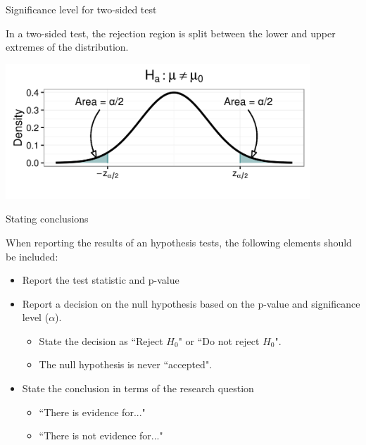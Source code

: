 \documentclass[xcolor=table, handout]{beamer}
\begin{document}
\begin{frame}{Significance level for two-sided test}
\begin{block}{}
\large
In a two-sided test, the rejection region is split between the lower and upper extremes of the distribution.
\end{block}
\bigskip
{\centering
\includegraphics[width=4.5in]{../images/ch08_sig_2}
\par}

\end{frame}


\begin{frame}{Stating conclusions}
\begin{block}{}
\large
When reporting the results of an hypothesis tests, the following elements should be included:
\begin{itemize}
\pause\item Report the test statistic and p-value
\pause\item Report a decision on the null hypothesis based on the p-value and significance level ($\alpha$). 
\begin{itemize}
\item State the decision as ``Reject $H_0$" or ``Do not reject $H_0$".
\item The null hypothesis is never ``accepted".
\end{itemize}
\pause\item State the conclusion in terms of the research question
\begin{itemize}
\item ``There is evidence for..."
\item ``There is not evidence for..."
\end{itemize}
\end{itemize}
\end{block}
\end{frame}
\end{document}

